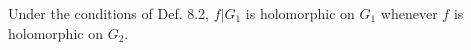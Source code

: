 Under the conditions of Def. 8.2, $f|G_1$ is holomorphic on $G_1$ whenever $f$ is holomorphic on $G_2$.
